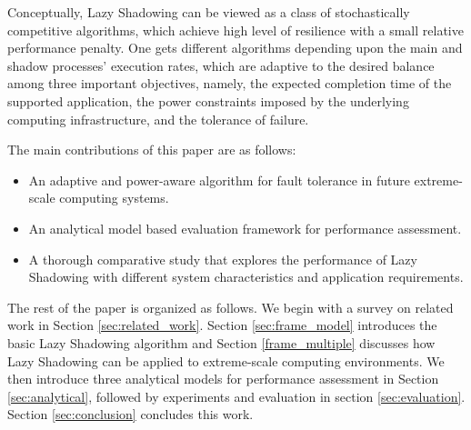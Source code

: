 Conceptually, Lazy Shadowing can be viewed as a class of stochastically competitive algorithms, which 
achieve high level of resilience with a small relative performance penalty.
One gets different algorithms depending upon the main and shadow processes' execution rates, which are adaptive to the desired balance among three important objectives, namely, the expected completion time of the supported application, the power constraints imposed by the underlying computing infrastructure, and the tolerance of failure. %

The main contributions of this paper are as follows:
\begin{itemize}
	\item An adaptive and power-aware algorithm for fault tolerance in future extreme-scale computing systems.
    \item An analytical model based evaluation framework for performance assessment.
	\item A thorough comparative study that explores the performance of Lazy Shadowing with different system characteristics and application requirements.
\end{itemize}


The rest of the paper is organized as follows. We begin with a survey on related work in Section 
\ref{sec:related_work}. Section \ref{sec:frame_model} introduces the basic Lazy Shadowing algorithm and Section \ref{frame_multiple} discusses how Lazy Shadowing can be applied to 
extreme-scale computing environments. 
We then introduce three analytical models for performance assessment
in Section \ref{sec:analytical}, 
followed by experiments and evaluation in
section \ref{sec:evaluation}. Section \ref{sec:conclusion} concludes this work.%
